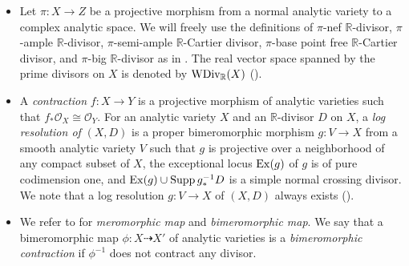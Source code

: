 \documentclass[12pt]{amsart}
\theoremstyle{definition}
\begin{document}
\begin{itemize}
\item
Let $\pi \colon X \to Z$ be a projective morphism from a normal analytic variety to a complex analytic space. 
We will freely use the definitions of $\pi$-nef $\mathbb{R}$-divisor, $\pi$-ample $\mathbb{R}$-divisor, $\pi$-semi-ample $\mathbb{R}$-Cartier divisor, $\pi$-base point free $\mathbb{R}$-Cartier divisor, and $\pi$-big $\mathbb{R}$-divisor as in \cite{fujino-analytic-bchm}. 
The real vector space spanned by the prime divisors on $X$ is denoted by ${\rm WDiv}_{\mathbb{R}}(X)$ (\cite[Definition 2.34]{fujino-analytic-bchm}). 

\item 
A {\em contraction} $f\colon X\to Y$ is a projective morphism of analytic varieties such that $f_{*}\mathcal{O}_{X}\cong \mathcal{O}_{Y}$. 
For an analytic variety $X$ and an $\mathbb{R}$-divisor $D$ on $X$, a {\em log resolution of} $(X,D)$ is a proper bimeromorphic morphism $g \colon V\to X$ from a smooth analytic variety $V$ such that $g$ is projective over a neighborhood of any compact subset of $X$, the exceptional locus ${\rm Ex}(g)$ of $g$ is of pure codimension one, and ${\rm Ex}(g)\cup {\rm Supp}\,g_{*}^{-1}D$ is a simple normal crossing divisor. 
We note that a log resolution $g \colon V\to X$ of $(X,D)$ always exists (\cite[Theorem 13.2]{resolution-1}). 

\item
We refer to \cite[Definition 2.30]{fujino-analytic-bchm} for {\em meromorphic map} and {\em bimeromorphic map}. 
We say that a bimeromorphic map $\phi\colon X \dashrightarrow X'$ of analytic varieties is a {\em bimeromorphic contraction} if $\phi^{-1}$ does not contract any divisor. 
\end{itemize}
\end{document}
